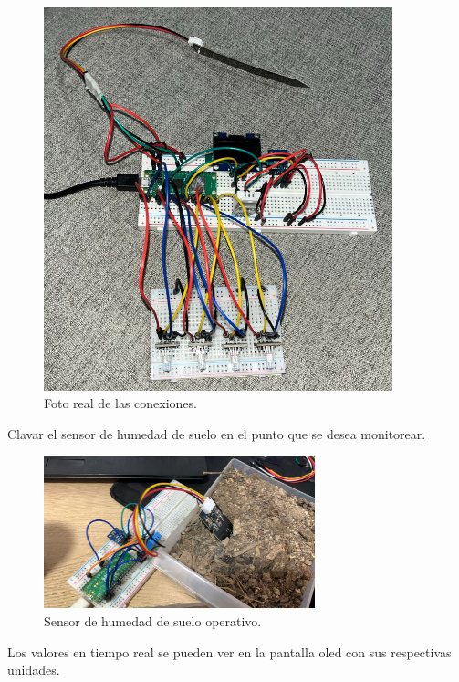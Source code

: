 \begin{figure}[h]
\centering
\includegraphics[width=0.9\textwidth]{img/fotos/conexiones_real.png}
\caption{Foto real de las conexiones.}
\end{figure}

Clavar el sensor de humedad de suelo en el punto que se desea monitorear.

\begin{figure}[h]
\centering
\includegraphics[width=0.7\textwidth]{img/fotos/sensorHumedadSuelo.png}
\caption{Sensor de humedad de suelo operativo.}
\end{figure}

Los valores en tiempo real se pueden ver en la pantalla oled con sus respectivas unidades.


